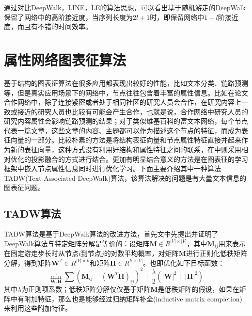 通过对比DeepWalk，LINE，LE的算法思想，可以看出基于随机游走的DeepWalk保留了网络中的高阶接近度，当序列长度为$2l+1$时，即保留网络中$1-l$阶接近度，而且有不错的时间效率。
\section{属性网络图表征算法}
基于结构的图表征算法在很多应用都表现出较好的性能，比如文本分类、链路预测等，但是真实应用场景下的网络中，节点往往包含着丰富的属性信息。比如在论文合作网络中，除了连接紧密或者处于相同社区的研究人员会合作，在研究内容上一致或接近的研究人员也比较有可能会产生合作，也就是说，合作网络中研究人员的研究内容属性会影响链路预测的结果；对于类似维基百科的富文本网络，每个节点代表一篇文章，这些文章的内容、主题都可以作为描述这个节点的特征，而成为表征向量的一部分。比较朴素的方法是将结构表征向量和节点属性特征直接并起来作为新的表征向量，这种方式没有利用好结构和属性特征之间的联系，在\cite{li2017attributed}中则采用相对优化的投影融合的方式进行结合。更加有明显结合意义的方法是在图表征的学习框架中嵌入节点属性信息同时进行优化学习。下面主要介绍其中一种算法TADW(Text-Associated DeepWalk)\cite{yang2015network}算法，该算法解决的问题是有大量文本信息的图表征问题。

\subsection{TADW算法}
TADW算法是基于DeepWalk算法的改进方法，首先文中先提出并证明了DeepWalk算法与特定矩阵分解是等价的：设矩阵$\textbf{M}\in R^{|V|\times |V|}$，其中$\textbf{M}_{ij}$用来表示在固定游走步长时从节点$i$到节点$j$的对数平均概率，对矩阵$\textbf{M}$进行正则化低秩矩阵分解\cite{yu2014large}，得到矩阵$\textbf{W}^T \in R^{|V| \times k}$和矩阵$\textbf{H} \in R^{k\times |V|}$。也即优化如下目标函数：
\begin{equation}
	\min_{\textbf{W},\textbf{H}} \sum(\textbf{M}_{ij}-(\textbf{W}^T\textbf{H})_{ij})^2 +\frac{\lambda}{2}(|\textbf{W}|^2+|\textbf{H}|^2)
\end{equation}
其中$\lambda$为正则项系数；低秩矩阵分解仅仅基于矩阵$\textbf{M}$是低秩矩阵的假设，如果在矩阵中有附加特征，那么也是能够经过归纳矩阵补全(inductive matrix completion)\cite{natarajan2014inductive}来利用这些附加特征。

